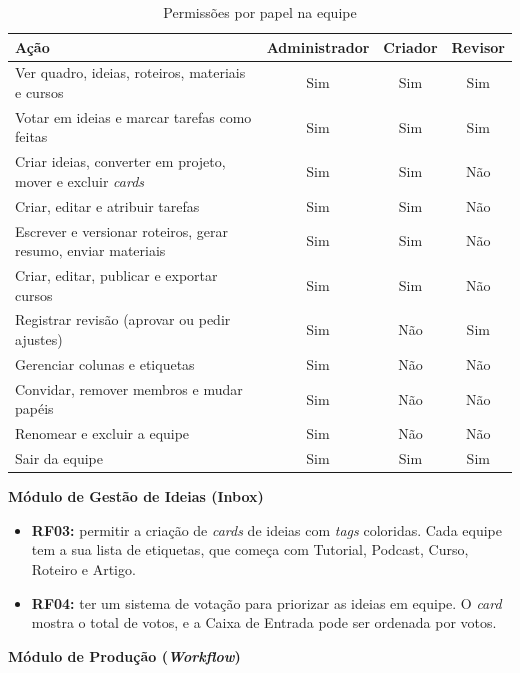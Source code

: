 \begin{table}[H]
\centering
\caption{Permissões por papel na equipe}
\label{tab:permissoes}
\small
\begin{tabular}{|p{8cm}|c|c|c|}
\hline
\textbf{Ação} & \textbf{Administrador} & \textbf{Criador} & \textbf{Revisor} \\
\hline
Ver quadro, ideias, roteiros, materiais e cursos & Sim & Sim & Sim \\
\hline
Votar em ideias e marcar tarefas como feitas & Sim & Sim & Sim \\
\hline
Criar ideias, converter em projeto, mover e excluir \textit{cards} & Sim & Sim & Não \\
\hline
Criar, editar e atribuir tarefas & Sim & Sim & Não \\
\hline
Escrever e versionar roteiros, gerar resumo, enviar materiais & Sim & Sim & Não \\
\hline
Criar, editar, publicar e exportar cursos & Sim & Sim & Não \\
\hline
Registrar revisão (aprovar ou pedir ajustes) & Sim & Não & Sim \\
\hline
Gerenciar colunas e etiquetas & Sim & Não & Não \\
\hline
Convidar, remover membros e mudar papéis & Sim & Não & Não \\
\hline
Renomear e excluir a equipe & Sim & Não & Não \\
\hline
Sair da equipe & Sim & Sim & Sim \\
\hline
\end{tabular}
\end{table}

\textbf{Módulo de Gestão de Ideias (Inbox)}

\begin{itemize}
    \item \textbf{RF03:} permitir a criação de \textit{cards} de ideias com \textit{tags} coloridas. Cada equipe tem a sua lista de etiquetas, que começa com Tutorial, Podcast, Curso, Roteiro e Artigo.
    \item \textbf{RF04:} ter um sistema de votação para priorizar as ideias em equipe. O \textit{card} mostra o total de votos, e a Caixa de Entrada pode ser ordenada por votos.
\end{itemize}

\textbf{Módulo de Produção (\textit{Workflow})}

